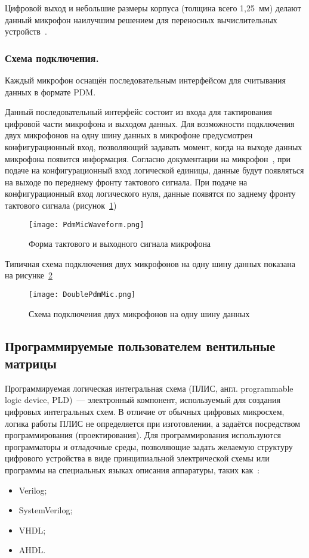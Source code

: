 Цифровой выход и небольшие размеры корпуса (толщина всего 1,25~мм) делают данный микрофон наилучшим решением для переносных вычислительных устройств~\cite{ST_MP45DT02}.

\subsubsection{Схема подключения. }
Каждый микрофон \micname{} оснащён последовательным интерфейсом для считывания данных в формате PDM.
 
Данный последовательный интерфейс состоит из входа для тактирования цифровой части микрофона и выходом данных. Для возможности подключения двух микрофонов на одну шину данных в микрофоне \micname{} предусмотрен конфигурационный вход, позволяющий задавать момент, когда на выходе данных микрофона появится информация. Согласно документации на микрофон~\cite{ST_MP45DT02}, при подаче на конфигурационный вход логической единицы, данные будут появляться на выходе по переднему фронту тактового сигнала. При подаче на конфигурационный вход логического нуля, данные появятся по заднему фронту тактового сигнала (рисунок~\ref{fig:PdmMicWaveform})
 
\begin{figure}[ht]
	\centering
	\texttt{[image: PdmMicWaveform.png]}  
	\caption{Форма тактового и выходного сигнала микрофона \micname{}}
	\label{fig:PdmMicWaveform}
\end{figure}
 
Типичная схема подключения двух микрофонов на одну шину данных показана на рисунке~\ref{fig:DoublePdmMic}

\begin{figure}[ht]
	\centering
	\texttt{[image: DoublePdmMic.png]}  
	\caption{Схема подключения двух микрофонов на одну шину данных}
	\label{fig:DoublePdmMic}
\end{figure}


\subsection{Программируемые пользователем вентильные матрицы}

Программируемая логическая интегральная схема (ПЛИС, англ. \foreignlanguage{english}{programmable logic device, PLD})~--- электронный компонент, используемый для создания цифровых интегральных схем. В отличие от обычных цифровых микросхем, логика работы ПЛИС не определяется при изготовлении, а задаётся посредством программирования (проектирования). Для программирования используются программаторы и отладочные среды, позволяющие задать желаемую структуру цифрового устройства в виде принципиальной электрической схемы или программы на специальных языках описания аппаратуры, таких как~\cite{Wiki_PLD}:
\begin{itemize}
	\item Verilog;
	\item SystemVerilog;
	\item VHDL;
	\item AHDL.
\end{itemize}
	
